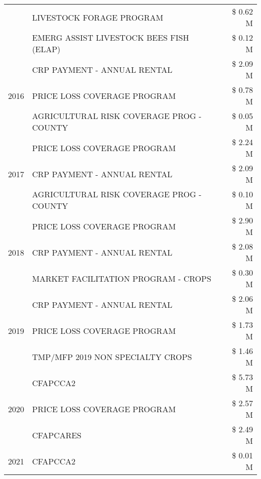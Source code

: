 \begin{tabular}{llr}
 & LIVESTOCK FORAGE PROGRAM & \$ 0.62 M \\
 & EMERG ASSIST LIVESTOCK BEES FISH (ELAP) & \$ 0.12 M \\
\cline{1-3}
\multirow[t]{3}{*}{2016} & CRP PAYMENT - ANNUAL RENTAL                   & \$ 2.09 M \\
 & PRICE LOSS COVERAGE PROGRAM                   & \$ 0.78 M \\
 & AGRICULTURAL RISK COVERAGE PROG - COUNTY      & \$ 0.05 M \\
\cline{1-3}
\multirow[t]{3}{*}{2017} & PRICE LOSS COVERAGE PROGRAM & \$ 2.24 M \\
 & CRP PAYMENT - ANNUAL RENTAL & \$ 2.09 M \\
 & AGRICULTURAL RISK COVERAGE PROG - COUNTY & \$ 0.10 M \\
\cline{1-3}
\multirow[t]{3}{*}{2018} & PRICE LOSS COVERAGE PROGRAM & \$ 2.90 M \\
 & CRP PAYMENT - ANNUAL RENTAL & \$ 2.08 M \\
 & MARKET FACILITATION PROGRAM - CROPS & \$ 0.30 M \\
\cline{1-3}
\multirow[t]{3}{*}{2019} & CRP PAYMENT - ANNUAL RENTAL & \$ 2.06 M \\
 & PRICE LOSS COVERAGE PROGRAM & \$ 1.73 M \\
 & TMP/MFP 2019 NON SPECIALTY CROPS & \$ 1.46 M \\
\cline{1-3}
\multirow[t]{3}{*}{2020} & CFAPCCA2 & \$ 5.73 M \\
 & PRICE LOSS COVERAGE PROGRAM & \$ 2.57 M \\
 & CFAPCARES & \$ 2.49 M \\
\cline{1-3}
2021 & CFAPCCA2 & \$ 0.01 M \\
\cline{1-3}
\bottomrule
\end{tabular}
